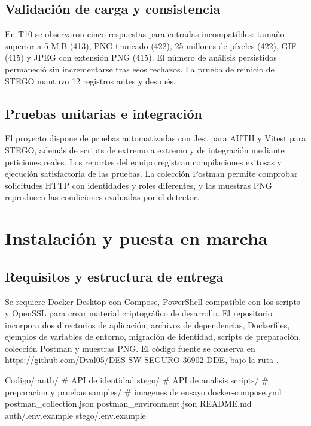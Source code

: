 \documentclass[11pt,a4paper,oneside]{article}
\newcommand{\code}[1]{{\footnotesize\texttt{\detokenize{#1}}}}
\begin{document}
\subsection{Validación de carga y consistencia}
En T10 se observaron cinco respuestas para entradas incompatibles: tamaño superior a 5 MiB (413), PNG truncado (422), 25 millones de píxeles (422), GIF (415) y JPEG con extensión PNG (415). El número de análisis persistidos permaneció sin incrementarse tras esos rechazos. La prueba de reinicio de STEGO mantuvo 12 registros antes y después.

\subsection{Pruebas unitarias e integración}
El proyecto dispone de pruebas automatizadas con Jest para AUTH y Vitest para STEGO, además de scripts de extremo a extremo y de integración mediante peticiones reales. Los reportes del equipo registran compilaciones exitosas y ejecución satisfactoria de las pruebas. La colección Postman permite comprobar solicitudes HTTP con identidades y roles diferentes, y las muestras PNG reproducen las condiciones evaluadas por el detector.

\section{Instalación y puesta en marcha}
\subsection{Requisitos y estructura de entrega}
Se requiere Docker Desktop con Compose, PowerShell compatible con los scripts y OpenSSL para crear material criptográfico de desarrollo. El repositorio incorpora dos directorios de aplicación, archivos de dependencias, Dockerfiles, ejemplos de variables de entorno, migración de identidad, scripts de preparación, colección Postman y muestras PNG. El código fuente se conserva en \url{https://github.com/Dval05/DES-SW-SEGURO-36902-DDE}, bajo la ruta \code{Unidad 1/Proyecto/Codigo}.

\begin{codetext}
Codigo/
  auth/                 # API de identidad
  stego/                # API de analisis
  scripts/              # preparacion y pruebas
  samples/              # imagenes de ensayo
  docker-compose.yml
  postman_collection.json
  postman_environment.json
  README.md
  auth/.env.example
  stego/.env.example
\end{codetext}
\end{document}
